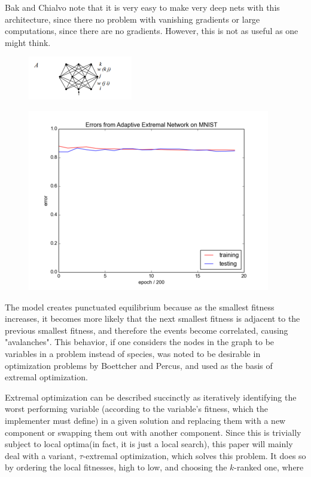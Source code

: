 \documentclass[12pt]{article}
\begin{document}
Bak and Chialvo note that it is very easy to make very deep nets with this architecture, since there no problem with vanishing gradients or large computations, since there are no gradients. However, this is not as useful as one might think.

\begin{figure}
  \includegraphics{bak_chialvo_net_topology}
\end{figure}
\begin{figure}
  \includegraphics{bak_plot}
\end{figure}

The model creates punctuated equilibrium because as the smallest fitness increases, it becomes more likely that the next smallest fitness is adjacent to the previous smallest fitness, and therefore the events become correlated, causing "avalanches". This behavior, if one considers the nodes in the graph to be variables in a problem instead of species, was noted to be desirable in optimization problems by Boettcher and Percus, and used as the basis of extremal optimization.

Extremal optimization can be described succinctly as iteratively identifying the worst performing variable (according to the variable's fitness, which the implementer must define) in a given solution and replacing them with a new component or swapping them out with another component. Since this is trivially subject to local optima(in fact, it is just a local search), this paper will mainly deal with a variant, $\tau$-extremal optimization, which solves this problem. It does so by ordering the local fitnesses, high to low, and choosing the $k$-ranked one, where
\end{document}
